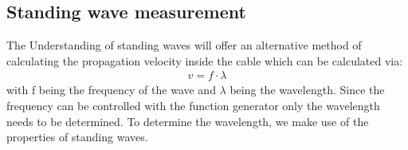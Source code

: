 \documentclass[a4paper,10pt,twocolumn]{article}
\begin{document}
    \subsection{Standing wave measurement}
    \label{subsec:standingWaveMeasurement}
    The Understanding of standing waves will offer an alternative method of calculating the propagation velocity inside the cable which can be calculated via:
    \begin{align}
        \label{eq:velocityStanding}
        v = f\cdot\lambda
        \end{align}
    with f being the frequency of the wave and $\lambda$ being the wavelength.
    Since the frequency can be controlled with the function generator only the wavelength needs to be determined.
    To determine the wavelength, we make use of the properties of standing waves. 
    
\end{document}
